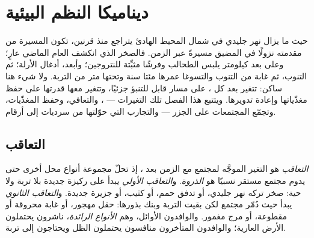 \chapter{ديناميكا النظم البيئية}\label{ch:b1:ecosystem-dynamics}

حيث ما يزال نهر جليدي في شمال المحيط الهادئ يتراجع منذ قرنين، تكون
المسيرة من مقدمته نزولًا في المضيق مسيرةً عبر الزمن. فالصخر الذي
انكشف العام الماضي عارٍ؛ وعلى بعد كيلومتر يلبس الطحالب وفرشًا
مثبِّتة للنتروجين؛ وأبعد، أدغال الأرلة؛ ثم التنوب، ثم غابة من
التنوب والتسوغا عمرها مئتا سنة وتحتها متر من التربة. ولا شيء هنا
ساكن:  تتغير بعد كل ، على مسار
قابل للتنبؤ جزئيًا، وتتغير معها قدرتها على حفظ مغذّياتها وإعادة
تدويرها. ويتتبع هذا الفصل تلك التغيرات ---
،  والتعافي، وحفظ المغذّيات،
وتجمّع المجتمعات على الجزر --- والتجارب التي
حوّلتها من سرديات إلى أرقام.

\section{التعاقب}

\begin{definition}\label{def:b1:ecosystem-dynamics:succession}
\emph{التعاقب} هو التغير الموجَّه لمجتمع مع الزمن
بعد ، إذ تحلّ مجموعة أنواع محل أخرى حتى يدوم مجتمع
مستقر نسبيًا هو \emph{الذروة}. و\emph{التعاقب
الأولي} يبدأ على ركيزة جديدة بلا تربة ولا 
حية: صخر تركه نهر جليدي، أو تدفق حمم، أو كثيب، أو جزيرة جديدة.
و\emph{التعاقب الثانوي} يبدأ حيث دُمّر مجتمع
لكن بقيت التربة وبنك بذورها: حقل مهجور،
أو غابة محروقة أو مقطوعة، أو مرج مغمور. والوافدون الأوائل،
وهم \emph{الأنواع الرائدة}، ناشرون يحتملون الأرض العارية؛
والوافدون المتأخرون منافسون يحتملون الظل ويحتاجون إلى تربة.
\end{definition}

